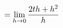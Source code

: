 \documentclass[preview]{standalone}
\begin{document}
\begin{align*}
\special{dvisvgm:raw <g id='unique000'>}=\lim_{h\to0}\frac{2th+h^2}{h}\special{dvisvgm:raw </g>}
\end{align*}
\end{document}
